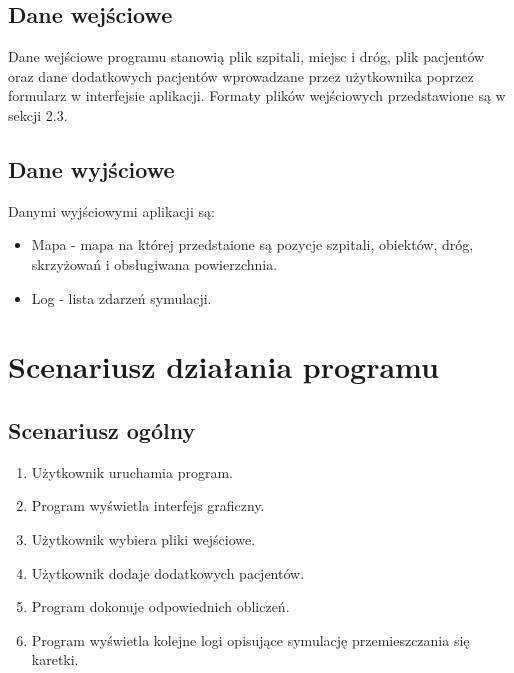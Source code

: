 \documentclass{article}
\begin{document}
\subsection{Dane wejściowe}
Dane wejściowe programu stanowią plik szpitali, miejsc i dróg, plik pacjentów oraz dane dodatkowych pacjentów wprowadzane przez użytkownika poprzez formularz w interfejsie aplikacji. Formaty plików wejściowych przedstawione są w sekcji 2.3.

\subsection{Dane wyjściowe}
Danymi wyjściowymi aplikacji są:
\begin{itemize}
    \item Mapa - mapa na której przedstaione są pozycje szpitali, obiektów, dróg, skrzyżowań i obsługiwana powierzchnia.
    \item Log - lista zdarzeń symulacji.
\end{itemize}

\section{Scenariusz działania programu}
\subsection{Scenariusz ogólny}
\begin{enumerate}
    \item Użytkownik uruchamia program.
    \item Program wyświetla interfejs graficzny.
    \item Użytkownik wybiera pliki wejściowe.
    \item Użytkownik dodaje dodatkowych pacjentów.
    \item Program dokonuje odpowiednich obliczeń.
    \item Program wyświetla kolejne logi opisujące symulację przemieszczania się karetki.
\end{enumerate}
\end{document}
